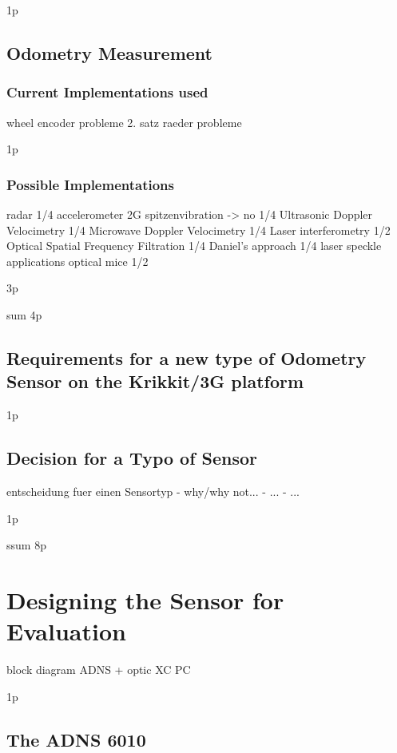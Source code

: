 \documentclass[12pt,a4paper]{article}
\begin{document}
1p

\subsection{Odometry Measurement}

\subsubsection{Current Implementations used}

      wheel encoder
        probleme
      2. satz raeder
        probleme

1p

\subsubsection{Possible Implementations}

      radar
1/4
      accelerometer
        2G spitzenvibration -> no
1/4
      Ultrasonic Doppler Velocimetry
1/4
      Microwave Doppler Velocimetry
1/4
      Laser interferometry
1/2
      Optical Spatial Frequency Filtration
1/4
        Daniel's approach
1/4
        laser speckle applications
        optical mice
1/2

3p

sum 4p

\subsection{Requirements for a new type of Odometry Sensor on the Krikkit/3G platform}

1p


\subsection{Decision for a Typo of Sensor}
  entscheidung fuer einen Sensortyp
    - why/why not...
    - ...
    - ...

1p


ssum 8p

\section{Designing the Sensor for Evaluation}

block diagram
  ADNS + optic
  XC
  PC

1p

\subsection{The ADNS 6010}
\end{document}
